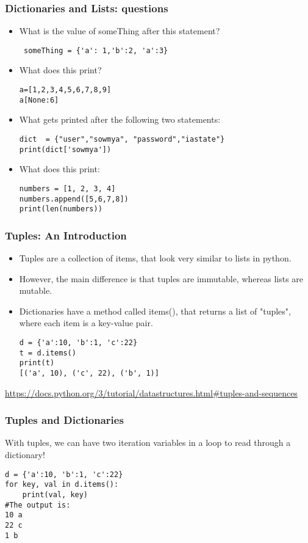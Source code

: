 \documentclass{beamer}
\begin{document}
\begin{frame}[fragile]
\frametitle{Dictionaries and Lists: questions}
\begin{itemize}
\item What is the value of someThing after this statement?
\begin{verbatim}
 someThing = {'a': 1,'b':2, 'a':3}
\end{verbatim} \pause
\item What does this print?
\begin{verbatim}
a=[1,2,3,4,5,6,7,8,9]
a[None:6]
\end{verbatim} \pause
\item What gets printed after the following two statements:
\begin{verbatim}
dict  = {"user","sowmya", "password","iastate"}
print(dict['sowmya'])
\end{verbatim}\pause
\item What does this print:
\begin{verbatim}
numbers = [1, 2, 3, 4]
numbers.append([5,6,7,8])
print(len(numbers))
\end{verbatim}
\end{itemize}
\end{frame}

\begin{frame}[fragile] %
\frametitle{Tuples: An Introduction}
\begin{itemize}
\item Tuples are a collection of items, that look very similar to lists in python.
\item However, the main difference is that tuples are immutable, whereas lists are mutable.
\item Dictionaries have a method called items(), that returns a list of "tuples", where each item is a key-value pair.
\begin{verbatim}
d = {'a':10, 'b':1, 'c':22}
t = d.items()
print(t)
[('a', 10), ('c', 22), ('b', 1)]
\end{verbatim}
\end{itemize} \tiny
\url{https://docs.python.org/3/tutorial/datastructures.html#tuples-and-sequences}
\end{frame} 

\begin{frame}[fragile]
\frametitle{Tuples and Dictionaries}
With tuples, we can have two iteration variables in a loop to read through a dictionary!
\begin{verbatim}
d = {'a':10, 'b':1, 'c':22}
for key, val in d.items():
    print(val, key)
#The output is:
10 a
22 c
1 b
\end{verbatim}
\end{frame}
\end{document}
